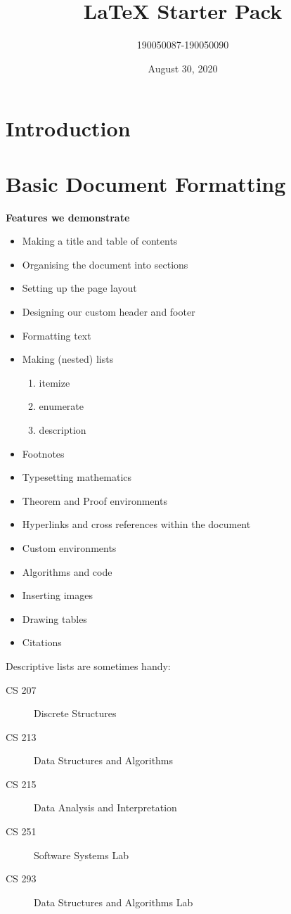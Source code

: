 \documentclass[12pt, letterpaper]{article}
\begin{document}
\title{LaTeX Starter Pack}
\author{190050087-190050090}
\date{August 30, 2020 }
\maketitle
\tableofcontents

\section{Introduction}
\label{intro}
\section{Basic Document Formatting}
\label{formatting}
\textbf{ Features we demonstrate}



\begin{itemize}
	\item Making a title and table of contents
	\item Organising the document into sections
	\item Setting up the page layout
	\item Designing our custom header and footer
	\item Formatting text
	\item Making (nested) lists
	\begin{enumerate}
		\item itemize
		\item enumerate
		\item description
	\end{enumerate}	
	\item Footnotes
	\item Typesetting mathematics
	\item Theorem and Proof environments
	\item Hyperlinks and cross references within the document 
	\item Custom environments
	\item Algorithms and code
	\item Inserting images
	\item Drawing tables
	\item Citations
\end{itemize}	



Descriptive lists are sometimes handy:


\begin{description}
	\item [CS 207] Discrete Structures
	\item [CS 213] Data Structures and Algorithms
	\item [CS 215] Data Analysis and Interpretation
	\item [CS 251] Software Systems Lab
	\item [CS 293] Data Structures and Algorithms Lab
\end{description}	
\end{document}

